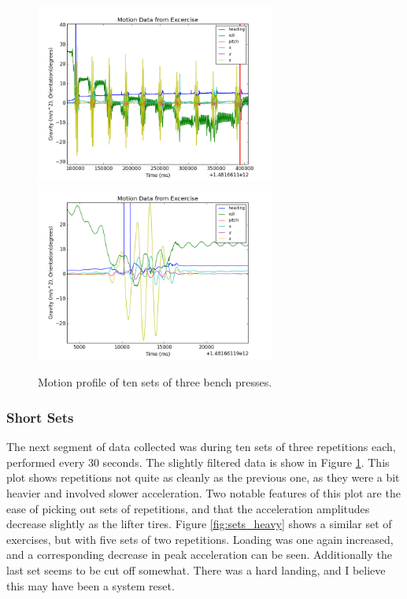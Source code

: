 \documentclass[11pt,oneside]{amsart}
\begin{document}
\begin{figure}[htbp]
\begin{center}
\includegraphics[width=0.7\textwidth]{figures/bench_sets.png}
\includegraphics[width=0.7\textwidth]{figures/bench_sets_detail.png}
\caption{Motion profile of ten sets of three bench presses.}
\label{fig:sets}
\end{center}
\end{figure}
\subsubsection{Short Sets}
The next segment of data collected was during ten sets of three repetitions each, performed every 30 seconds. The slightly filtered data is show in Figure \ref{fig:sets}. This plot shows repetitions not quite as cleanly as the previous one, as they were a bit heavier and involved slower acceleration. Two notable features of this plot are the ease of picking out sets of repetitions, and that the acceleration amplitudes decrease slightly as the lifter tires. Figure \ref{fig:sets_heavy} shows a similar set of exercises, but with five sets of two repetitions.  Loading was one again increased, and a corresponding decrease in peak acceleration can be seen. Additionally the last set seems to be cut off somewhat. There was a hard landing, and I believe this may have been a system reset.
\end{document}
